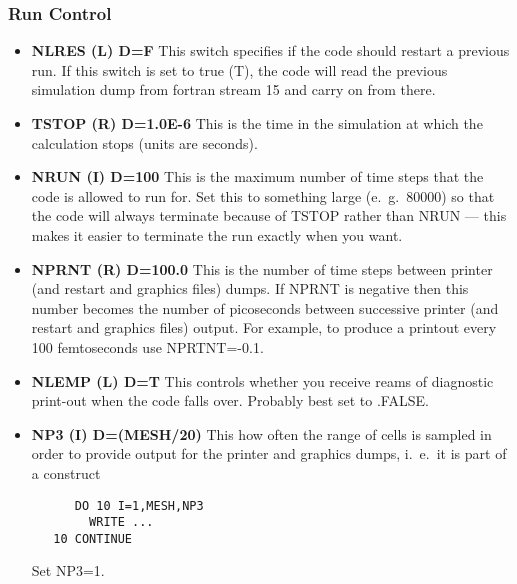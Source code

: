 \subsubsection{\bf Run Control}
\begin{itemize}
\item {\bf NLRES (L) D=F} This switch specifies if the code should restart a previous run.
If this switch is set to true (T), the code will read the previous simulation dump from fortran stream 15
and carry on from there.
\item {\bf TSTOP (R) D=1.0E-6}
This is the time in the simulation at which the calculation stops
(units are seconds).
\item {\bf NRUN (I) D=100}
This is the maximum number of time steps that the code is allowed to run
for. Set this to something large (e.\ g.\ 80000) so that the code will
always terminate because of TSTOP rather than NRUN --- this makes it
easier to terminate the run exactly when you want.
\item {\bf NPRNT (R) D=100.0}
This is the number of time steps between printer (and restart and graphics
files) dumps. If NPRNT
is negative then this number becomes the number of picoseconds between
successive printer (and restart and graphics files) output. For example, to produce
a printout every 100 femtoseconds use NPRTNT=-0.1.
\item {\bf NLEMP (L) D=T}
This controls whether you receive reams of diagnostic print-out when the
code falls over. Probably best set to .FALSE.
\item {\bf NP3 (I) D=(MESH/20)}
This how often the range of cells is sampled in order to provide output
for the printer and graphics dumps, i.\ e.\ it is part of a construct
\begin{verbatim}
      DO 10 I=1,MESH,NP3
        WRITE ...
   10 CONTINUE
\end{verbatim}
Set NP3=1.
\end{itemize}
\vspace*{5mm}

